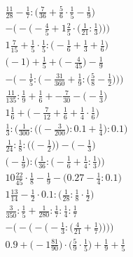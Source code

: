\documentclass[8pt]{article}
\begin{document}
\begin{align}
\frac{11}{28} - \frac{1}{7} : \big(\frac{7}{36} + \frac{5}{6} \cdot \frac{1}{5} - \frac{1}{9}\big) \\
-\bigg(-\Big(-\frac{4}{5} + 1\frac{2}{5} \cdot \big(\frac{1}{21} : \frac{1}{3}\big)\Big)\bigg) \\
1\frac{7}{15} + \frac{1}{5} \cdot \frac{1}{5} : \big(-\frac{1}{6} + \frac{1}{3} + \frac{1}{6}\big) \\
\big(-1\big) + \frac{1}{5} + \big(-\frac{4}{45}\big) - \frac{1}{9} \\
-\bigg(-\frac{1}{5} : \Big(-\frac{31}{360} + \frac{1}{9} : \big(\frac{5}{8} - \frac{1}{2}\big)\Big)\bigg) \\
\frac{11}{135} : \frac{1}{9} + \frac{1}{6} + -\frac{7}{30} - \big(-\frac{1}{3}\big) \\
1\frac{1}{6} + \big(-\frac{7}{12} + \frac{1}{6} + \frac{1}{4} \cdot \frac{1}{6}\big) \\
\frac{1}{3} : \bigg(\frac{1}{300} : \Big(\big(-\frac{3}{200}\big) : 0.1 + \frac{1}{4}\Big) : 0.1\bigg) \\
\frac{1}{24} : \frac{1}{8} : \Big(\big(-\frac{1}{2}\big)\Big) - \Big(-\frac{1}{3}\Big) \\
\Big(-\frac{1}{9}\Big) : \Big(\frac{1}{36} : \big(-\frac{1}{6} + \frac{1}{4} : \frac{1}{3}\big)\Big) \\
10\frac{22}{45} \cdot \frac{1}{8} - \frac{1}{9} - \big(0.27 - \frac{1}{4} : 0.1\big) \\
1\frac{13}{14} - \frac{1}{2} \cdot 0.1 : \big(\frac{1}{28} : \frac{1}{8} \cdot \frac{1}{2}\big) \\
\frac{3}{350} : \frac{1}{5} + \frac{1}{280} : \frac{1}{7} : \frac{1}{4} : \frac{1}{7} \\
-\Bigg(-\bigg(-\Big(-\frac{1}{3} : \big(\frac{4}{21} + \frac{1}{7}\big)\Big)\bigg)\Bigg) \\
0.9 + \big(-1\frac{81}{90}\big) \cdot \big(\frac{5}{9} \cdot \frac{1}{5}\big) + \frac{1}{9} + \frac{1}{5}
\end{align}
\end{document}
